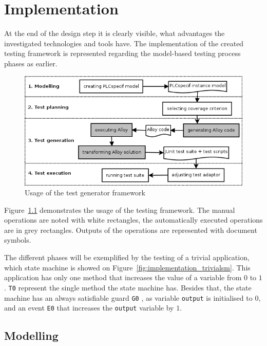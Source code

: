\chapter{Implementation}
\label{cha:implementation}

At the end of the design step it is clearly visible, what advantages the investigated technologies and tools have. The implementation of the created testing framework is represented regarding the model-based testing process phases as earlier.

\begin{figure}[htp]
\centering
\includegraphics[scale=0.6]{figures/implementation_usage}
\caption{Usage of the test generator framework}
\label{fig:implementation_usage}
\end{figure}

Figure~\ref{fig:implementation_usage} demonstrates the usage of the testing framework. The manual operations are noted with white rectangles, the automatically executed operations are in grey rectangles. Outputs of the operations are represented with document symbols.

The different phases will be exemplified by the testing of a trivial application, which state machine is showed on Figure~\ref{fig:implementation_trivialsm}. This application has only one method that increases the value of a variable from $0$ to $1$. \texttt{T0} represent the single method the state machine has. Besides that, the state machine has an always satisfiable guard \texttt{G0} , as variable \texttt{output} is initialised to $0$, and an event \texttt{E0} that increases the \texttt{output} variable by $1$. 

\section{Modelling}
\label{sec:implementationmodelling}

